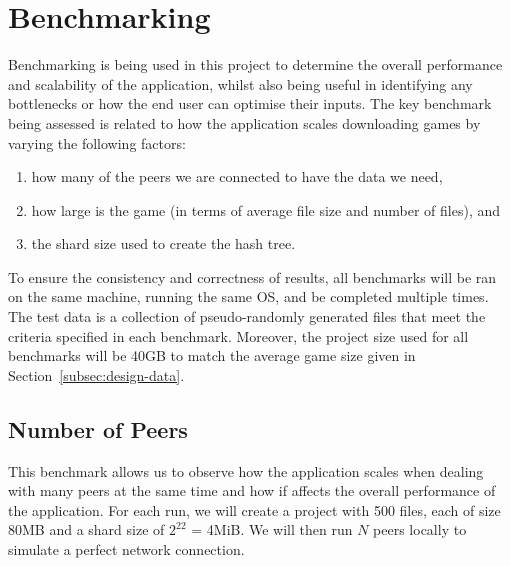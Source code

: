 
\newpage
\section{Benchmarking}\label{sec:benchmark}

Benchmarking is being used in this project to determine the overall performance and scalability of the application, whilst also being useful in identifying any bottlenecks or how the end user can optimise their inputs. The key benchmark being assessed is related to how the application scales downloading games by varying the following factors:

\begin{enumerate}
  \item how many of the peers we are connected to have the data we need,
  \item how large is the game (in terms of average file size and number of files), and
  \item the shard size used to create the hash tree.
\end{enumerate}

\vspace{2mm}\noindent
To ensure the consistency and correctness of results, all benchmarks will be ran on the same machine, running the same OS, and be completed multiple times. The test data is a collection of pseudo-randomly generated files that meet the criteria specified in each benchmark. Moreover, the project size used for all benchmarks will be 40GB to match the average game size given in Section~\ref{subsec:design-data}.

\subsection*{Number of Peers}

This benchmark allows us to observe how the application scales when dealing with many peers at the same time and how if affects the overall performance of the application.
\x
For each run, we will create a project with 500 files, each of size 80MB and a shard size of $2^{22}$ = 4MiB. We will then run $N$ peers locally to simulate a perfect network connection.

